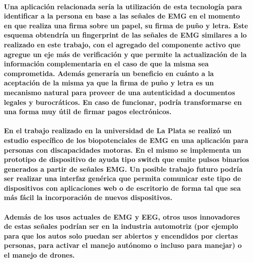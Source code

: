 \documentclass{article}
\begin{document}
\paragraph{
Una aplicación relacionada sería la utilización de esta tecnología para identificar a la persona en base a las señales de EMG en el momento en que realiza una firma sobre un papel, su firma de puño y letra.  Este esquema obtendría un fingerprint de las señales de EMG similares a lo realizado en este trabajo, con el agregado del componente activo que agregue un eje más de verificación y que permite la actualización de la información complementaria en el caso de que la misma sea comprometida.  Además generaría un beneficio en cuánto a la aceptación de la misma ya que la firma de puño y letra es un mecanismo natural para proveer de una autenticidad a documentos legales y burocráticos. En caso de funcionar, podría transformarse en una forma muy útil de firmar pagos electrónicos.
}

\paragraph{
En el trabajo realizado en la universidad de La Plata \cite{haberman2016} se realizó un estudio específico de los biopotenciales de EMG en una aplicación para personas con discapacidades motoras. En el mismo se implementa un prototipo de dispositivo de ayuda tipo switch que emite pulsos binarios generados a partir de señales EMG. Un posible trabajo futuro podría ser realizar una interfaz genérica que permita comunicar este tipo de dispositivos con aplicaciones web o de escritorio de forma tal que sea más fácil la incorporación de nuevos dispositivos.
}

\paragraph{
Además de los usos actuales de EMG y EEG, otros usos innovadores de estas señales podrían ser en la industria automotriz (por ejemplo para que los autos solo puedan ser abiertos y encendidos por ciertas personas, para activar el manejo autónomo o incluso para manejar) o el manejo de drones.
}



\clearpage
\nocite{opinnovationswebsite}
\nocite{charbit2017}
\nocite{bressert2012}
\nocite{angkoon2009}
\nocite{oliphant2015}
\nocite{langtangen2016}
\nocite{hassanien2015}
\nocite{moonwon2016}
\nocite{sharma2016}
\nocite{trewin}
\nocite{chowdhury2013}
\nocite{siqueira2015}
\nocite{samsung2016}
\nocite{raez2006}
\nocite{esparza2017}
\nocite{sanei2007}
\nocite{haberman2016}

\printbibliography[heading=bibintoc,title={Bibliografía}]
\end{document}
